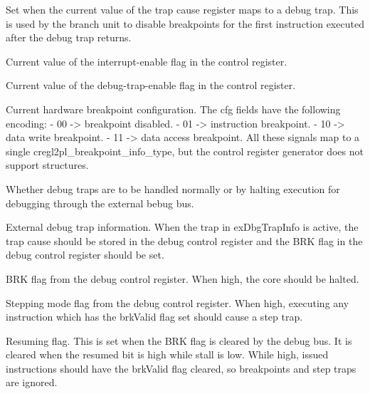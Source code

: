 \ifaceSubGroup{}
Set when the current value of the trap cause register maps to a debug trap. This 
is used by the branch unit to disable breakpoints for the first instruction 
executed after the debug trap returns.

\ifaceSubGroup{}
Current value of the interrupt-enable flag in the control register.

\ifaceSubGroup{}
Current value of the debug-trap-enable flag in the control register.

\ifaceSubGroup{}
Current hardware breakpoint configuration. The cfg fields have the following
encoding:
 - 00 -> breakpoint disabled.
 - 01 -> instruction breakpoint.
 - 10 -> data write breakpoint.
 - 11 -> data access breakpoint.
All these signals map to a single cregl2pl_breakpoint_info_type, but the
control register generator does not support structures.

\ifaceSubGroup{}
Whether debug traps are to be handled normally or by halting execution for 
debugging through the external bebug bus.

\ifaceSubGroup{}
External debug trap information. When the trap in exDbgTrapInfo is active, the 
trap cause should be stored in the debug control register and the BRK flag in 
the debug control register should be set.

\ifaceSubGroup{}
BRK flag from the debug control register. When high, the core should be halted.

\ifaceSubGroup{}
Stepping mode flag from the debug control register. When high, executing any 
instruction which has the brkValid flag set should cause a step trap.

\ifaceSubGroup{}
Resuming flag. This is set when the BRK flag is cleared by the debug bus. It is 
cleared when the resumed bit is high while stall is low. While high, issued 
instructions should have the brkValid flag cleared, so breakpoints and step 
traps are ignored.
    
